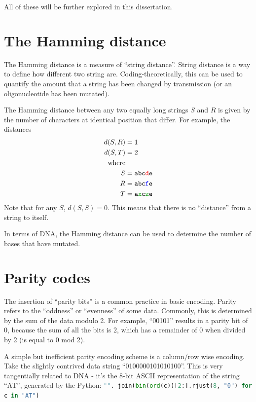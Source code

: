 \documentclass{article}
\begin{document}
    All of these will be further explored in this dissertation.

    \section{The Hamming distance}

    The Hamming distance is a measure of ``string distance''. String
    distance is a way to define how different two string are.
    Coding-theoretically, this can be used to quantify the amount that a
    string has been changed by transmission (or an oligonucleotide has been
    mutated).

    The Hamming distance between any two equally long strings $S$ and $R$
    is given by the number of characters at identical position that differ.
    For example, the distances 
    \begin{align*}
    d(S, R) &= 1\\
    d(S, T) &= 2\\
    \text{where}\\
    S &= \texttt{abc\textcolor{red}{d}e}\\
    R &= \texttt{abc\textcolor{blue}{f}e}\\
    T &= \texttt{a\textcolor{codegreen}{x}c\textcolor{codegreen}{z}e}
    \end{align*}
    Note that for any $S$, $d(S, S) = 0$. This means that there is no
    ``distance'' from a string to itself.

    In terms of DNA, the Hamming distance can be used to determine the
    number of bases that have mutated.


    \section{Parity codes}

    The insertion of ``parity bits'' is a common practice in basic encoding.
    Parity refers to the ``oddness'' or ``evenness'' of some data. Commonly,
    this is determined by the sum of the data modulo 2. For example, ``00101''
    results in a parity bit of 0, because the sum of all the bits is 2, which
    has a remainder of 0 when divided by 2 (is equal to 0 mod 2).

    A simple but inefficient parity encoding scheme is a column/row wise
    encoding. Take the slightly contrived data string ``0100000101010100''.
    This is very tangentially related to DNA - it's the 8-bit ASCII
    representation of the string ``AT'', generated by the Python:
    \lstinline[language=Python]|"". join(bin(ord(c))[2:].rjust(8, "0") for c in "AT")|
\end{document}
